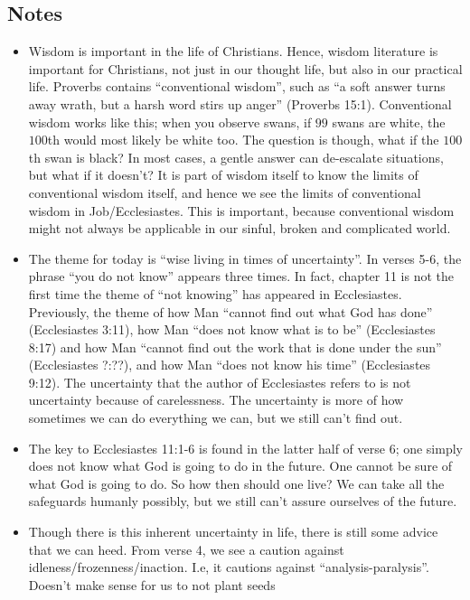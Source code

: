 \subsection*{Notes}
\begin{itemize}
  \item{Wisdom is important in the life of Christians.  Hence, wisdom
  literature is important for Christians, not just in our thought life, but
  also in our practical life.  Proverbs contains ``conventional wisdom'',
  such as ``a soft answer turns away wrath, but a harsh word stirs up anger''
  (Proverbs 15:1).  Conventional wisdom works like this; when you observe
  swans, if $99$ swans are white, the $100$th would most likely be white too.
  The question is though, what if the $100$th swan is black?  In most cases,
  a gentle answer can de-escalate situations, but what if it doesn't?  It is
  part of wisdom itself to know the limits of conventional wisdom itself, and
  hence we see the limits of conventional wisdom in Job/Ecclesiastes.  This
  is important, because conventional wisdom might not always be applicable in
  our sinful, broken and complicated world.}
  \item{The theme for today is ``wise living in times of uncertainty''.  In
  verses 5-6, the phrase ``you do not know'' appears three times.  In fact,
  chapter 11 is not the first time the theme of ``not knowing'' has appeared
  in Ecclesiastes.  Previously, the theme of how Man ``cannot find out what
  God has done'' (Ecclesiastes 3:11), how Man ``does not know what is to be''
  (Ecclesiastes 8:17) and how Man ``cannot find out the work that is done
  under the sun'' (Ecclesiastes ?:??), and how Man ``does not know his time''
  (Ecclesiastes 9:12).  The uncertainty that the author of Ecclesiastes
  refers to is not uncertainty because of carelessness.  The uncertainty is
  more of how sometimes we can do everything we can, but we still can't find
  out.}
  \item{The key to Ecclesiastes 11:1-6 is found in the latter half of verse
  6; one simply does not know what God is going to do in the future.  One
  cannot be sure of what God is going to do.  So how then should one live?
  We can take all the safeguards humanly possibly, but we still can't assure
  ourselves of the future.}
  \item{Though there is this inherent uncertainty in life, there is still
  some advice that we can heed.  From verse 4, we see a caution against
  idleness/frozenness/inaction.  I.e, it cautions against
  ``analysis-paralysis''.  Doesn't make sense for us to not plant seeds
}
\end{itemize}
